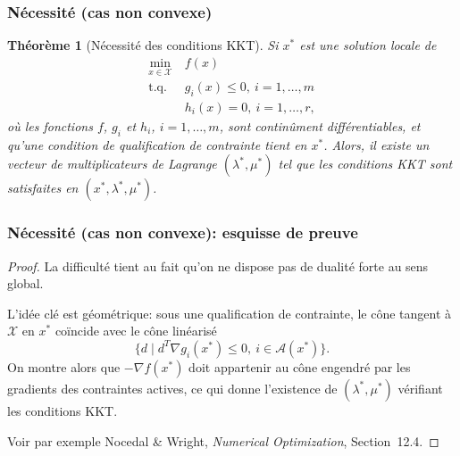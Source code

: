 \documentclass[usepdftitle=false,aspectratio=169]{beamer}
\newtheorem{thm}{Théorème}
\def\cA{\mathcal{A}}
\def\cX{\mathcal{X}}
\begin{document}
\begin{frame}
\frametitle{Nécessité (cas non convexe)}

\begin{thm}[Nécessité des conditions KKT]
Si $x^*$ est une solution locale de
\begin{align*}
\min_{x \in \cX} \ & f(x) \\
\mbox{t.q. } & g_i(x) \leq 0,\ i = 1,\ldots,m \\
& h_i(x) = 0,\ i = 1,\ldots,r,
\end{align*}
où les fonctions $f$, $g_i$ et $h_i$, $i = 1,\ldots,m$, sont continûment différentiables, et qu'une condition de qualification de contrainte tient en $x^*$.
Alors, il existe un vecteur de multiplicateurs de Lagrange $(\lambda^*, \mu^*)$ tel que les conditions KKT sont satisfaites en $(x^*,\lambda^*, \mu^*)$.
\end{thm}

\end{frame}

\begin{frame}
\frametitle{Nécessité (cas non convexe): esquisse de preuve}

\begin{proof}
La difficulté tient au fait qu'on ne dispose pas de dualité forte au sens global.

\mbox{}

L'idée clé est géométrique: sous une qualification de contrainte, le cône tangent à $\cX$ en $x^*$ coïncide avec le cône linéarisé
$$
\{ d \mid d^T\nabla g_i(x^*) \leq 0,\ i\in\cA(x^*) \}.
$$
On montre alors que $-\nabla f(x^*)$ doit appartenir au cône engendré par les gradients des contraintes actives, ce qui donne l'existence de $(\lambda^*,\mu^*)$ vérifiant les conditions KKT.

\mbox{}

Voir par exemple Nocedal \& Wright, \textit{Numerical Optimization}, Section~12.4.
\end{proof}

\end{frame}
\end{document}
